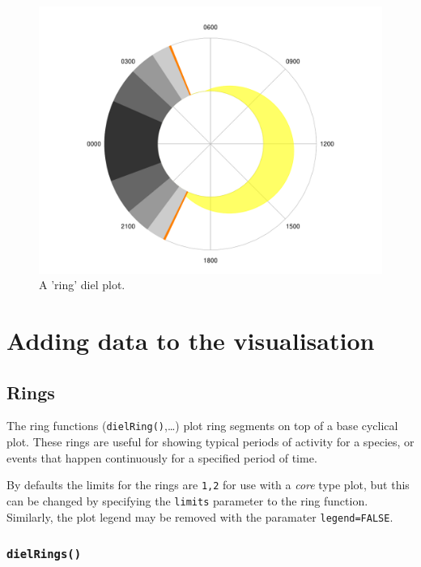 \documentclass[
]{book}
\begin{document}
\begin{figure}

{\centering \includegraphics[width=0.9\linewidth]{_main_files/figure-latex/diel-plot-ring-1} 

}

\caption{A 'ring' diel plot.}\label{fig:diel-plot-ring}
\end{figure}

\hypertarget{adding-to-cyclical}{%
\section{Adding data to the visualisation}\label{adding-to-cyclical}}

\hypertarget{rings}{%
\subsection{Rings}\label{rings}}

The ring functions (\texttt{dielRing()},\ldots) plot ring segments on top of a base cyclical plot. These rings are useful for showing typical periods of activity for a species, or events that happen continuously for a specified period of time.

By defaults the limits for the rings are \texttt{1,2} for use with a \emph{core} type plot, but this can be changed by specifying the \texttt{limits} parameter to the ring function. Similarly, the plot legend may be removed with the paramater \texttt{legend=FALSE}.

\hypertarget{dielrings}{%
\subsubsection{\texorpdfstring{\texttt{dielRings()}}{dielRings()}}\label{dielrings}}
\end{document}
